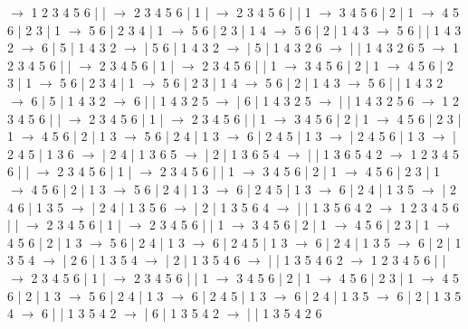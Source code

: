 \documentclass{article}
\begin{document}
\newline
 $\rightarrow$ 1 2 3 4 5 6 |  |  $\rightarrow$ 2 3 4 5 6 | 1 |  $\rightarrow$ 2 3 4 5 6 |  | 1 $\rightarrow$ 3 4 5 6 | 2 | 1 $\rightarrow$ 4 5 6 | 2 3 | 1 $\rightarrow$ 5 6 | 2 3 4 | 1 $\rightarrow$ 5 6 | 2 3 | 1 4 $\rightarrow$ 5 6 | 2 | 1 4 3 $\rightarrow$ 5 6 |  | 1 4 3 2 $\rightarrow$ 6 | 5 | 1 4 3 2 $\rightarrow$  | 5 6 | 1 4 3 2 $\rightarrow$  | 5 | 1 4 3 2 6 $\rightarrow$  |  | 1 4 3 2 6 5
\newline
 $\rightarrow$ 1 2 3 4 5 6 |  |  $\rightarrow$ 2 3 4 5 6 | 1 |  $\rightarrow$ 2 3 4 5 6 |  | 1 $\rightarrow$ 3 4 5 6 | 2 | 1 $\rightarrow$ 4 5 6 | 2 3 | 1 $\rightarrow$ 5 6 | 2 3 4 | 1 $\rightarrow$ 5 6 | 2 3 | 1 4 $\rightarrow$ 5 6 | 2 | 1 4 3 $\rightarrow$ 5 6 |  | 1 4 3 2 $\rightarrow$ 6 | 5 | 1 4 3 2 $\rightarrow$ 6 |  | 1 4 3 2 5 $\rightarrow$  | 6 | 1 4 3 2 5 $\rightarrow$  |  | 1 4 3 2 5 6
\newline
 $\rightarrow$ 1 2 3 4 5 6 |  |  $\rightarrow$ 2 3 4 5 6 | 1 |  $\rightarrow$ 2 3 4 5 6 |  | 1 $\rightarrow$ 3 4 5 6 | 2 | 1 $\rightarrow$ 4 5 6 | 2 3 | 1 $\rightarrow$ 4 5 6 | 2 | 1 3 $\rightarrow$ 5 6 | 2 4 | 1 3 $\rightarrow$ 6 | 2 4 5 | 1 3 $\rightarrow$  | 2 4 5 6 | 1 3 $\rightarrow$  | 2 4 5 | 1 3 6 $\rightarrow$  | 2 4 | 1 3 6 5 $\rightarrow$  | 2 | 1 3 6 5 4 $\rightarrow$  |  | 1 3 6 5 4 2
\newline
 $\rightarrow$ 1 2 3 4 5 6 |  |  $\rightarrow$ 2 3 4 5 6 | 1 |  $\rightarrow$ 2 3 4 5 6 |  | 1 $\rightarrow$ 3 4 5 6 | 2 | 1 $\rightarrow$ 4 5 6 | 2 3 | 1 $\rightarrow$ 4 5 6 | 2 | 1 3 $\rightarrow$ 5 6 | 2 4 | 1 3 $\rightarrow$ 6 | 2 4 5 | 1 3 $\rightarrow$ 6 | 2 4 | 1 3 5 $\rightarrow$  | 2 4 6 | 1 3 5 $\rightarrow$  | 2 4 | 1 3 5 6 $\rightarrow$  | 2 | 1 3 5 6 4 $\rightarrow$  |  | 1 3 5 6 4 2
\newline
 $\rightarrow$ 1 2 3 4 5 6 |  |  $\rightarrow$ 2 3 4 5 6 | 1 |  $\rightarrow$ 2 3 4 5 6 |  | 1 $\rightarrow$ 3 4 5 6 | 2 | 1 $\rightarrow$ 4 5 6 | 2 3 | 1 $\rightarrow$ 4 5 6 | 2 | 1 3 $\rightarrow$ 5 6 | 2 4 | 1 3 $\rightarrow$ 6 | 2 4 5 | 1 3 $\rightarrow$ 6 | 2 4 | 1 3 5 $\rightarrow$ 6 | 2 | 1 3 5 4 $\rightarrow$  | 2 6 | 1 3 5 4 $\rightarrow$  | 2 | 1 3 5 4 6 $\rightarrow$  |  | 1 3 5 4 6 2
\newline
 $\rightarrow$ 1 2 3 4 5 6 |  |  $\rightarrow$ 2 3 4 5 6 | 1 |  $\rightarrow$ 2 3 4 5 6 |  | 1 $\rightarrow$ 3 4 5 6 | 2 | 1 $\rightarrow$ 4 5 6 | 2 3 | 1 $\rightarrow$ 4 5 6 | 2 | 1 3 $\rightarrow$ 5 6 | 2 4 | 1 3 $\rightarrow$ 6 | 2 4 5 | 1 3 $\rightarrow$ 6 | 2 4 | 1 3 5 $\rightarrow$ 6 | 2 | 1 3 5 4 $\rightarrow$ 6 |  | 1 3 5 4 2 $\rightarrow$  | 6 | 1 3 5 4 2 $\rightarrow$  |  | 1 3 5 4 2 6
\end{document}
